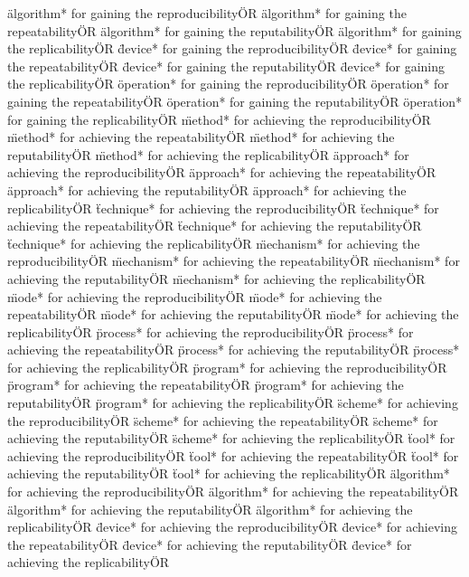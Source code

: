 \documentclass[
10pt, %
a4paper, %
oneside, %
headinclude,footinclude, %
BCOR5mm, %
]{scrartcl}
\begin{document}
\"algorithm* for gaining the reproducibility\" OR \"algorithm* for gaining the repeatability\" OR \"algorithm* for gaining the reputability\" OR \"algorithm* for gaining the replicability\" OR 
\"device* for gaining the reproducibility\" OR \"device* for gaining the repeatability\" OR \"device* for gaining the reputability\" OR \"device* for gaining the replicability\" OR 
\"operation* for gaining the reproducibility\" OR \"operation* for gaining the repeatability\" OR \"operation* for gaining the reputability\" OR \"operation* for gaining the replicability\" OR 
\"method* for achieving the reproducibility\" OR \"method* for achieving the repeatability\" OR \"method* for achieving the reputability\" OR \"method* for achieving the replicability\" OR 
\"approach* for achieving the reproducibility\" OR \"approach* for achieving the repeatability\" OR \"approach* for achieving the reputability\" OR \"approach* for achieving the replicability\" OR 
\"technique* for achieving the reproducibility\" OR \"technique* for achieving the repeatability\" OR \"technique* for achieving the reputability\" OR \"technique* for achieving the replicability\" OR 
\"mechanism* for achieving the reproducibility\" OR \"mechanism* for achieving the repeatability\" OR \"mechanism* for achieving the reputability\" OR \"mechanism* for achieving the replicability\" OR 
\"mode* for achieving the reproducibility\" OR \"mode* for achieving the repeatability\" OR \"mode* for achieving the reputability\" OR \"mode* for achieving the replicability\" OR 
\"process* for achieving the reproducibility\" OR \"process* for achieving the repeatability\" OR \"process* for achieving the reputability\" OR \"process* for achieving the replicability\" OR 
\"program* for achieving the reproducibility\" OR \"program* for achieving the repeatability\" OR \"program* for achieving the reputability\" OR \"program* for achieving the replicability\" OR 
\"scheme* for achieving the reproducibility\" OR \"scheme* for achieving the repeatability\" OR \"scheme* for achieving the reputability\" OR \"scheme* for achieving the replicability\" OR 
\"tool* for achieving the reproducibility\" OR \"tool* for achieving the repeatability\" OR \"tool* for achieving the reputability\" OR \"tool* for achieving the replicability\" OR 
\"algorithm* for achieving the reproducibility\" OR \"algorithm* for achieving the repeatability\" OR \"algorithm* for achieving the reputability\" OR \"algorithm* for achieving the replicability\" OR 
\"device* for achieving the reproducibility\" OR \"device* for achieving the repeatability\" OR \"device* for achieving the reputability\" OR \"device* for achieving the replicability\" OR 
\end{document}
